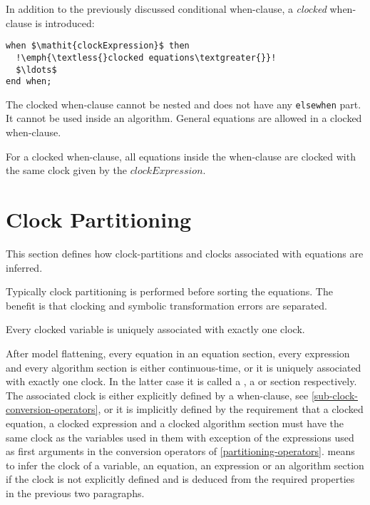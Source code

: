 In addition to the previously discussed conditional when-clause, a
\emph{clocked} when-clause is introduced:
\begin{lstlisting}[language=modelica,escapechar=!]
when $\mathit{clockExpression}$ then
  !\emph{\textless{}clocked equations\textgreater{}}!
  $\ldots$
end when;
\end{lstlisting}

The clocked when-clause cannot be nested and does not have any \lstinline!elsewhen! part.  It cannot be used inside an algorithm.  General equations are allowed in a clocked when-clause.

For a clocked when-clause, all equations inside the when-clause are clocked with the same clock given by the $\mathit{clockExpression}$.

\section{Clock Partitioning}\label{clock-partitioning}

This section defines how clock-partitions and clocks associated with
equations are inferred.

\begin{nonnormative}
Typically clock partitioning is performed before sorting the equations.  The benefit is that clocking and symbolic transformation errors are separated.
\end{nonnormative}

Every clocked variable is uniquely associated with exactly one clock.

After model flattening, every equation in an equation section, every expression and every algorithm section is either continuous-time, or it is uniquely associated with exactly one clock.
In the latter case it is called a , a  or  section respectively.
The associated clock is either explicitly defined by a when-clause, see \cref{sub-clock-conversion-operators}, or it is implicitly defined by the requirement that a clocked equation, a clocked expression and a clocked algorithm section must have the same clock as the variables used in them with exception of the expressions used as first arguments in the conversion operators of \cref{partitioning-operators}.
 means to infer the clock of a variable, an equation, an expression or an algorithm section if the clock is not explicitly defined and is deduced from the required properties in the previous two paragraphs.


